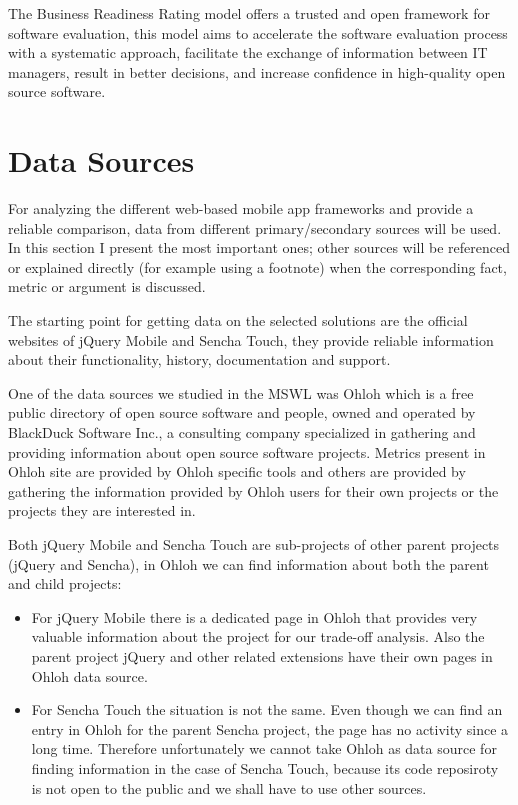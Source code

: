 \documentclass[a4paper,12pt]{book}
\begin{document}
The Business Readiness Rating model offers a trusted and open framework for software evaluation, this model aims to accelerate the software evaluation process with a systematic approach, facilitate the exchange of information between IT managers, result in better decisions, and increase confidence in high-quality open source software.

\section{Data Sources}
\label{sec:data}

For analyzing the different web-based mobile app frameworks and provide a reliable comparison, data from different primary/secondary sources will be used. In this section I present the most important ones; other sources will be referenced or explained directly (for example using a footnote) when the corresponding fact, metric or argument is discussed.

The starting point for getting data on the selected solutions are the official websites of jQuery Mobile\cite{jquery} and Sencha Touch\cite{sencha}, they provide reliable information about their functionality, history, documentation and support. 

One of the data sources we studied in the MSWL was Ohloh\cite{Ohloh} which is a free public
directory of open source software and people, owned and operated by BlackDuck Software Inc., a consulting company specialized in gathering and providing information about open source software projects. Metrics present in Ohloh site are provided by Ohloh specific tools and others are provided by gathering the information provided by Ohloh users for their own projects or the projects they are interested in.

Both jQuery Mobile and Sencha Touch are sub-projects of other parent projects (jQuery and Sencha), in Ohloh we can find information about both the parent and child projects:

\begin{itemize}
 \item For jQuery Mobile there is a dedicated page in Ohloh\cite{ojquery} that provides very valuable information about the project for our trade-off analysis. Also the parent project jQuery\cite{ojqueryparent} and other related extensions have their own pages in Ohloh data source.
 \item For Sencha Touch the situation is not the same. Even though we can find an entry in Ohloh for the parent Sencha project\cite{osencha}, the page has no activity since a long time. Therefore unfortunately we cannot take Ohloh as data source for finding information in the case of Sencha Touch, because its code reposiroty is not open to the public and we shall have to use other sources.
\end{itemize}
\end{document}
